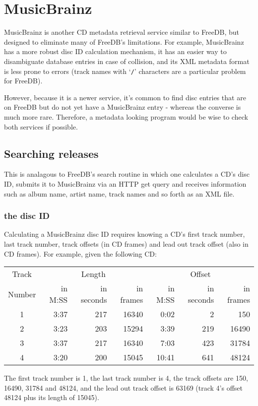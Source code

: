 \chapter{MusicBrainz}
MusicBrainz is another CD metadata retrieval service similar to FreeDB,
but designed to eliminate many of FreeDB's limitations.
For example, MusicBrainz has a more robust disc ID calculation mechanism,
it has an easier way to disambiguate database entries in case of collision,
and its XML metadata format is less prone to errors
(track names with `\texttt{/}' characters are a particular problem for
FreeDB).

However, because it is a newer service, it's common to find disc entries
that are on FreeDB but do not yet have a MusicBrainz entry - whereas
the converse is much more rare.
Therefore, a metadata looking program would be wise to check both
services if possible.

\section{Searching releases}
This is analagous to FreeDB's search routine in which one calculates
a CD's disc ID, submits it to MusicBrainz via an HTTP get query
and receives information such as album name, artist name, track names
and so forth as an XML file.

\pagebreak

\subsection{the disc ID}
Calculating a MusicBrainz disc ID requires knowing a CD's first track number,
last track number, track offsets (in CD frames) and lead out track offset
(also in CD frames).
For example, given the following CD:
\begin{table}[h]
\begin{tabular}{|c||r|r|r||r|r|r|}
\hline
Track & \multicolumn{3}{c||}{Length} & \multicolumn{3}{c|}{Offset} \\
Number & in M:SS & in seconds & in frames & in M:SS & in seconds & in frames \\
\hline
1 & 3:37 & 217 & 16340 & 0:02 & 2 & 150 \\
2 & 3:23 & 203 & 15294 & 3:39 & 219 & 16490 \\
3 & 3:37 & 217 & 16340 & 7:03 & 423 & 31784 \\
4 & 3:20 & 200 & 15045 & 10:41 & 641 & 48124 \\
\hline
\end{tabular}
\end{table}
\par
\noindent
The first track number is 1, the last track number is 4, the track offsets
are 150, 16490, 31784 and 48124, and the lead out track offset is
63169 (track 4's offset 48124 plus its length of 15045).

